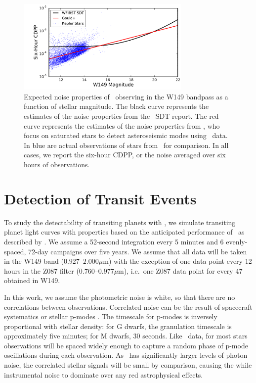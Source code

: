 \begin{figure}[htbp!]
\centerline{\includegraphics[width=0.75\textwidth]{chapter8/f1.pdf}}
\caption[Expected noise properties of \WF\ observing in the W149 bandpass as a function of
stellar magnitude]{Expected noise properties of \WF\ observing in the W149 bandpass as a function of
stellar magnitude. The black curve represents the estimates of the noise properties from the
\WF\ SDT report. The red curve represents the estimates of the noise properties from 
\citet{Gould15}, who focus on saturated stars to detect asteroseismic modes using \WF\ data.
In blue are actual observations of stars from \kep\ for comparison. In all cases, we report
the six-hour CDPP, or the noise averaged over six hours of observations.}
\label{fig:noise}
\end{figure}



\section{Detection of Transit Events}
\label{sec:transits}

To study the detectability of transiting planets with \WF, we
simulate transiting planet light curves with properties based on the
anticipated performance of \WF\, as described by \citet{Gould15}. We
assume a 52-second integration every 5 minutes and 6 evenly-spaced,
72-day campaigns over five years. We assume that all data will be
taken in the W149 band ($\textrm{0.927--2.000}\mu$m) with the exception of one data point
every 12 hours in the Z087 filter
($\textrm{0.760--0.977}\mu$m), i.e.\ one Z087 data point for every 47 obtained
in W149.

In this work, we assume the photometric noise is white, so that there are no correlations
between observations. 
Correlated noise can be the result of spacecraft systematics or stellar p-modes 
\citep{Gilliland10, Campante11}. 
The timescale for p-modes is inversely proportional with stellar density:
for G dwarfs, the granulation timescale is approximately five minutes; for M dwarfs, 
30 seconds. 
Like \kep\ data, for most stars observations will be 
spaced widely enough to capture a random phase of p-mode oscillations during each observation.
As \WF\ has significantly larger levels of photon noise, the correlated
stellar signals will be small by comparison, causing the while instrumental noise to dominate
over any red astrophysical effects.




